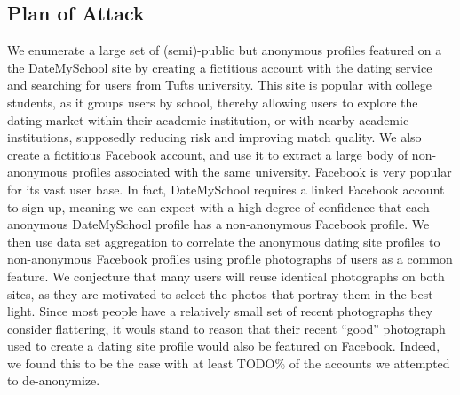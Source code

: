\subsection{Plan of Attack}
\label{sec:intro_plan_of_attack}

We enumerate a large set of (semi)-public but anonymous profiles featured on a the DateMySchool\cite{dms2014} site by creating a fictitious account with the dating service and searching for users from Tufts university.
This site is popular with college students, as it groups users by school, thereby allowing users to explore the dating market within their academic institution, or with nearby academic institutions, supposedly reducing risk and improving match quality.
We also create a fictitious Facebook\cite{fb2014} account, and use it to extract a large body of non-anonymous profiles associated with the same university.
Facebook is very popular for its vast user base.
In fact, DateMySchool requires a linked Facebook account to sign up, meaning we can expect with a high degree of confidence that each anonymous DateMySchool profile has a non-anonymous Facebook profile.
We then use data set aggregation to correlate the anonymous dating site profiles to non-anonymous Facebook profiles using profile photographs of users as a common feature.
We conjecture that many users will reuse identical photographs on both sites, as they are motivated to select the photos that portray them in the best light.
Since most people have a relatively small set of recent photographs they consider flattering, it wouls stand to reason that their recent ``good'' photograph used to create a dating site profile would also be featured on Facebook.
Indeed, we found this to be the case with at least TODO\% of the accounts we attempted to de-anonymize.
